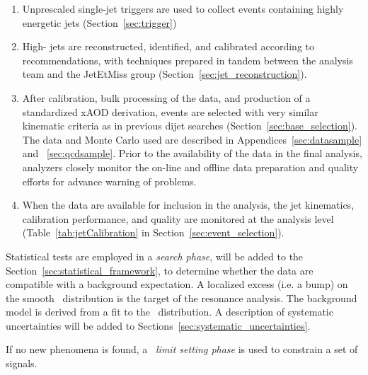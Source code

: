 \begin{enumerate}
\item Unprescaled single-jet triggers are used to collect events containing
highly energetic jets (Section~\ref{sec:trigger})
\item High-\pT\xspace jets are reconstructed, identified, and calibrated according to recommendations, with techniques
prepared in tandem between the analysis team and the
JetEtMiss group (Section~\ref{sec:jet_reconstruction}).
\item After calibration, bulk processing of the data, and production of a standardized xAOD derivation, events are selected with very similar kinematic 
criteria as in previous dijet searches (Section~\ref{sec:base_selection}). The data and Monte Carlo used are described in
Appendices~\ref{sec:datasample} and ~\ref{sec:qcdsample}. Prior to the availability of the data in the final
analysis, analyzers closely monitor the on-line and offline data preparation and
quality efforts for advance warning of problems.%
\item When the data are available for inclusion in the analysis, the jet kinematics, calibration performance, 
and quality are monitored at the analysis level (Table~\ref{tab:jetCalibration} in Section~\ref{sec:event_selection}).
\end{enumerate}

Statistical tests are employed in a
\textit{search phase}, will be added to the Section~\ref{sec:statistical_framework}, to determine whether the 
data are compatible with a background expectation. 
A localized excess (i.e. a bump) on the smooth \mjj\  distribution
is the target of the resonance analysis.
The background model is derived from a fit to the \mjj\ distribution.
A description of systematic uncertainties will be added to 
Sections~\ref{sec:systematic_uncertainties}. 

If no new phenomena is found, a ~\textit{limit setting phase} is used
to constrain a set of signals. 


